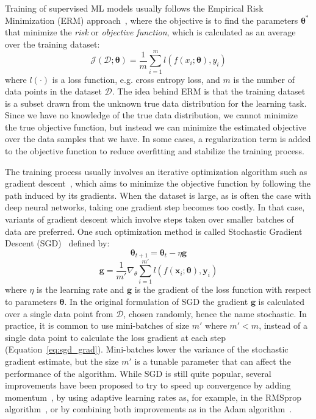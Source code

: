 Training of supervised ML models usually follows the Empirical Risk Minimization (ERM) approach~, where the objective is to find the parameters $\mathbf{\theta}^*$ that minimize the \textit{risk} or \textit{objective function}, which is calculated as an average over the training dataset:
\begin{equation}
    \mathcal{J}(\mathcal{D};\mathbf{\theta}) = \frac{1}{m}\sum_{i=1}^{m}l(f(x_{i}; \mathbf{\theta}), y_{i})
\end{equation}
where $l(\cdot)$ is a loss function, e.g. cross entropy loss, and $m$ is the number of data points in the dataset $\mathcal{D}$. 
The idea behind ERM is that the training dataset is a subset drawn from the unknown true data distribution for the learning task. Since we have no knowledge of the true data distribution, we cannot minimize the true objective function, but instead we can minimize the estimated objective over the data samples that we have. In some cases, a regularization term is added to the objective function to reduce overfitting and stabilize the training process.

The training process usually involves an iterative optimization algorithm such as gradient descent~, which aims to minimize the objective function by following the path induced by its gradients. When the dataset is large, as is often the case with deep neural networks, taking one gradient step becomes too costly. In that case, variants of gradient descent which involve steps taken over smaller batches of data are preferred. One such optimization method is called Stochastic Gradient Descent (SGD)~ defined by:
\begin{equation}
        \label{eq:theta_update}
        \mathbf{\theta}_{t+1} = \mathbf{\theta}_{t} - \eta \textbf{g}  
\end{equation}
\begin{equation}
    \label{eq:sgd_grad}
     \textbf{g} = \frac{1}{m'} \nabla_{\theta} \sum_{i=1}^{m'}  l(f(\mathbf{x}_{i}; \mathbf{\theta}), \mathbf{y}_{i})
\end{equation}
where $\eta$ is the learning rate and $\mathbf{g}$ is the gradient of the loss function with respect to parameters $\mathbf{\theta}$. In the original formulation of SGD the gradient $\mathbf{g}$ is calculated over a single data point from $\mathcal{D}$, chosen randomly, hence the name stochastic. In practice, it is  common to use mini-batches of size $m'$ where $m' < m$, instead of a single data point to calculate the loss gradient at each step (Equation~\ref{eq:sgd_grad}). Mini-batches lower the variance of the stochastic gradient estimate, but the size $m'$ is a tunable parameter that can affect the performance of the algorithm. While SGD is still quite popular, several improvements have been proposed to try to speed up convergence by adding momentum~, by using adaptive learning rates as, for example, in the  RMSprop algorithm~, or by combining both improvements as in the Adam algorithm~.

